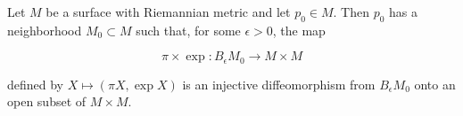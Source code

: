 Let $M$ be a surface with Riemannian metric and let $p_0 \in M$. Then $p_0$ has a neighborhood $M_0 \subset M$ such that, for some $\epsilon > 0$, the map

$$\pi \times \exp: B_\epsilon M_0 \rightarrow M \times M$$

defined by $X \mapsto (\pi X, \exp X)$ is an injective diffeomorphism from $B_\epsilon M_0$ onto an open subset of $M \times M$.
